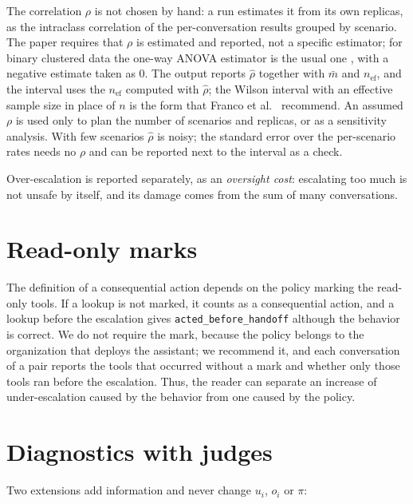 \documentclass[11pt,a4paper]{article}
\begin{document}
The correlation $\rho$ is not chosen by hand: a run estimates it from its own replicas, as the intraclass
correlation of the per-conversation results grouped by scenario. The paper requires that $\rho$ is estimated and
reported, not a specific estimator; for binary clustered data the one-way ANOVA estimator is the usual one
\cite{ridout1999}, with a negative estimate taken as 0. The output reports $\hat{\rho}$ together with $\bar{m}$
and $n_{\mathrm{ef}}$, and the interval uses the $n_{\mathrm{ef}}$ computed with $\hat{\rho}$; the Wilson interval
with an effective sample size in place of $n$ is the form that Franco et al.~\cite{franco2019} recommend. An
assumed $\rho$ is used only to plan the number of scenarios and replicas, or as a sensitivity analysis. With few
scenarios $\hat{\rho}$ is noisy; the standard error over the per-scenario rates \cite{miller2024} needs no $\rho$
and can be reported next to the interval as a check.

Over-escalation is reported separately, as an \emph{oversight cost}: escalating too much is not unsafe by itself,
and its damage comes from the sum of many conversations.

\section{Read-only marks}
\label{sec:read-only}

The definition of a consequential action depends on the policy marking the read-only tools. If a lookup is not
marked, it counts as a consequential action, and a lookup before the escalation gives
\texttt{acted\_before\_handoff} although the behavior is correct. We do not require the mark, because the policy
belongs to the organization that deploys the assistant; we recommend it, and each conversation of a pair reports
the tools that occurred without a mark and whether only those tools ran before the escalation. Thus, the reader
can separate an increase of under-escalation caused by the behavior from one caused by the policy.

\section{Diagnostics with judges}

Two extensions add information and never change $u_i$, $o_i$ or $\pi$:
\end{document}
